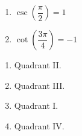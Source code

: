 \documentclass{ximera}
\begin{document}
\begin{multicols}{3}

\begin{enumerate}

\setcounter{enumi}{\value{HW}}

\item $\csc \left( \dfrac{\pi}{2} \right) = 1$ 
\item $\cot \left( \dfrac{3\pi}{4} \right) = -1$

\setcounter{HW}{\value{enumi}}

\end{enumerate}

\end{multicols}

\begin{multicols}{4}

\begin{enumerate}
\setcounter{enumi}{\value{HW}}

\item   Quadrant II.

\item Quadrant III.

\item  Quadrant I.

\item Quadrant IV.


\setcounter{HW}{\value{enumi}}
\end{enumerate}

\end{multicols}
\end{document}
